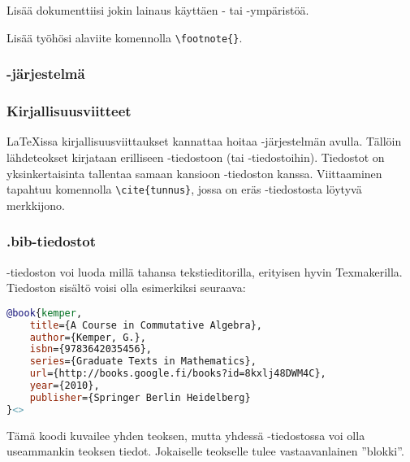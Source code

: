 \begin{fframe}
    \begin{harj}
        Lisää dokumenttiisi jokin lainaus käyttäen - tai -ympäristöä. 
    \end{harj}
    \begin{harj}
        Lisää työhösi alaviite komennolla \lstinline-\footnote{}-. 
    \end{harj}
\end{fframe}

\subsubsection{\BibTeX-järjestelmä}
\begin{fframe}
    \frametitle{Kirjallisuusviitteet}
    \LaTeX issa kirjallisuusviittaukset kannattaa hoitaa \BibTeX-järjestelmän avulla. 
    \pause
    \vaihto
    Tällöin lähdeteokset kirjataan erilliseen -tiedostoon (tai -tiedostoihin).
    \pause
    \vaihto
    Tiedostot on yksinkertaisinta tallentaa samaan kansioon -tiedoston kanssa.
    \pause
    \vaihto
    Viittaaminen tapahtuu komennolla \lstinline-\cite{tunnus}-, jossa  on eräs -tiedostosta löytyvä merkkijono.
\end{fframe}

\begin{fframe}
    \frametitle{.bib-tiedostot}
    -tiedoston voi luoda millä tahansa tekstieditorilla, erityisen hyvin Texmakerilla. 
    \pause
    \vaihto
    Tiedoston sisältö voisi olla esimerkiksi seuraava:
    \begin{lstlisting}[language=BibTeX,basicstyle=\ttfamily\small]
@book{kemper,
    title={A Course in Commutative Algebra},
    author={Kemper, G.},
    isbn={9783642035456},
    series={Graduate Texts in Mathematics},
    url={http://books.google.fi/books?id=8kxlj48DWM4C},
    year={2010},
    publisher={Springer Berlin Heidelberg}
}<>
    \end{lstlisting}
    \pause
    Tämä koodi kuvailee yhden teoksen, mutta yhdessä -tiedostossa voi olla useammankin teoksen tiedot. Jokaiselle teokselle tulee vastaavanlainen ''blokki''.
\end{fframe}

